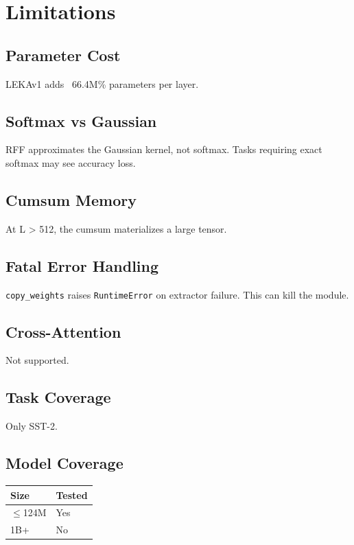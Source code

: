 \section{Limitations}

\subsection{Parameter Cost}

LEKAv1 adds ~66.4M\% parameters per layer.

\subsection{Softmax vs Gaussian}

RFF approximates the Gaussian kernel, not softmax. Tasks requiring exact 
softmax may see accuracy loss.

\subsection{Cumsum Memory}

At L \textgreater{} 512, the cumsum materializes a large tensor.

\subsection{Fatal Error Handling}

\texttt{copy\_weights} raises \texttt{RuntimeError} on extractor failure. This can kill 
the module.

\subsection{Cross-Attention}

Not supported.

\subsection{Task Coverage}

Only SST-2.

\subsection{Model Coverage}

\begin{table}[H]
\centering
\small
\begin{tabular}{ll}
\toprule
\textbf{Size} & \textbf{Tested} \\
\midrule
$\le$124M & Yes \\
1B+ & No \\
\bottomrule
\end{tabular}
\end{table}

